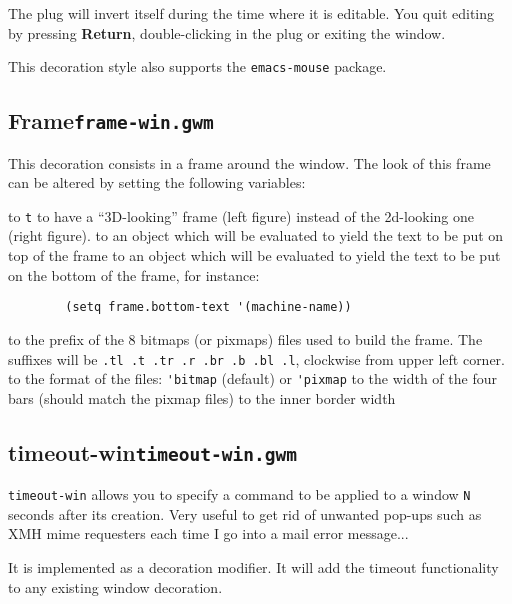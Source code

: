 The plug will invert itself during the time where it is editable. You quit
editing by pressing {\bf Return}, double-clicking in the plug or exiting the
window.

This decoration style also supports the \verb"emacs-mouse" package.

\subsection{Frame\hfill{\tt frame-win.gwm}}
\label{frame-win}

\centerline{}

This decoration consists in a frame around the window. The look of this
frame can be altered by setting the following variables:

\begin{description}
 to {\tt t} to have a ``3D-looking'' frame (left figure) 
instead of the 2d-looking one (right figure).
 to an object which will be evaluated to yield the
text to be put on top of the frame
 to an object which will be evaluated to yield the
text to be put on the bottom of the frame, for instance:
{\exemplefont\begin{verbatim}
        (setq frame.bottom-text '(machine-name))
\end{verbatim}}
 to the prefix of the 8 bitmaps (or pixmaps) files
used to build the frame. The suffixes will be {\tt .tl .t .tr .r .br .b .bl
.l}, clockwise from upper left corner.
 to the format of the files: \verb"'bitmap"
(default) or \verb"'pixmap"
 to the width of the four bars (should match the
pixmap files)
 to the inner border width
\end{description}

\subsection{timeout-win\hfill{\tt timeout-win.gwm}}
\label{timeout-win}

{\tt timeout-win} allows you to specify a command to be applied to a window
{\tt N} seconds after its creation. Very useful to get rid of unwanted pop-ups
such as XMH mime requesters each time I go into a mail error message...

It is implemented as a decoration modifier. It will add the timeout
functionality to any existing window decoration.  

